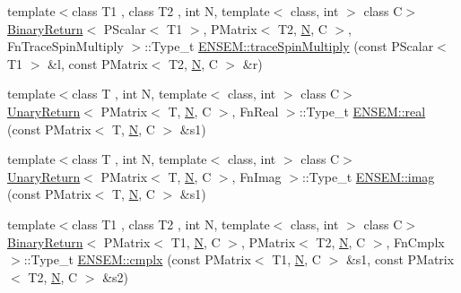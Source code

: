 \begin{DoxyCompactItemize}
\item 
{\footnotesize template$<$class T1 , class T2 , int N, template$<$ class, int $>$ class C$>$ }\\\mbox{\hyperlink{structBinaryReturn}{Binary\+Return}}$<$ P\+Scalar$<$ T1 $>$, P\+Matrix$<$ T2, \mbox{\hyperlink{adat__devel_2lib_2hadron_2operator__name__util_8cc_a7722c8ecbb62d99aee7ce68b1752f337}{N}}, C $>$, Fn\+Trace\+Spin\+Multiply $>$\+::Type\+\_\+t \mbox{\hyperlink{group__primmatrix_gafb9febbc048f38bb6e1dc7d60d8dde8d}{E\+N\+S\+E\+M\+::trace\+Spin\+Multiply}} (const P\+Scalar$<$ T1 $>$ \&l, const P\+Matrix$<$ T2, \mbox{\hyperlink{adat__devel_2lib_2hadron_2operator__name__util_8cc_a7722c8ecbb62d99aee7ce68b1752f337}{N}}, C $>$ \&r)
\item 
{\footnotesize template$<$class T , int N, template$<$ class, int $>$ class C$>$ }\\\mbox{\hyperlink{structUnaryReturn}{Unary\+Return}}$<$ P\+Matrix$<$ T, \mbox{\hyperlink{adat__devel_2lib_2hadron_2operator__name__util_8cc_a7722c8ecbb62d99aee7ce68b1752f337}{N}}, C $>$, Fn\+Real $>$\+::Type\+\_\+t \mbox{\hyperlink{group__primmatrix_ga5d6f44c46b47f8dc972b40a518058e0e}{E\+N\+S\+E\+M\+::real}} (const P\+Matrix$<$ T, \mbox{\hyperlink{adat__devel_2lib_2hadron_2operator__name__util_8cc_a7722c8ecbb62d99aee7ce68b1752f337}{N}}, C $>$ \&s1)
\item 
{\footnotesize template$<$class T , int N, template$<$ class, int $>$ class C$>$ }\\\mbox{\hyperlink{structUnaryReturn}{Unary\+Return}}$<$ P\+Matrix$<$ T, \mbox{\hyperlink{adat__devel_2lib_2hadron_2operator__name__util_8cc_a7722c8ecbb62d99aee7ce68b1752f337}{N}}, C $>$, Fn\+Imag $>$\+::Type\+\_\+t \mbox{\hyperlink{group__primmatrix_ga0e708a122654c3ad8295f071a5857abb}{E\+N\+S\+E\+M\+::imag}} (const P\+Matrix$<$ T, \mbox{\hyperlink{adat__devel_2lib_2hadron_2operator__name__util_8cc_a7722c8ecbb62d99aee7ce68b1752f337}{N}}, C $>$ \&s1)
\item 
{\footnotesize template$<$class T1 , class T2 , int N, template$<$ class, int $>$ class C$>$ }\\\mbox{\hyperlink{structBinaryReturn}{Binary\+Return}}$<$ P\+Matrix$<$ T1, \mbox{\hyperlink{adat__devel_2lib_2hadron_2operator__name__util_8cc_a7722c8ecbb62d99aee7ce68b1752f337}{N}}, C $>$, P\+Matrix$<$ T2, \mbox{\hyperlink{adat__devel_2lib_2hadron_2operator__name__util_8cc_a7722c8ecbb62d99aee7ce68b1752f337}{N}}, C $>$, Fn\+Cmplx $>$\+::Type\+\_\+t \mbox{\hyperlink{group__primmatrix_ga895c61e14c8d4206a949f44e36add5c6}{E\+N\+S\+E\+M\+::cmplx}} (const P\+Matrix$<$ T1, \mbox{\hyperlink{adat__devel_2lib_2hadron_2operator__name__util_8cc_a7722c8ecbb62d99aee7ce68b1752f337}{N}}, C $>$ \&s1, const P\+Matrix$<$ T2, \mbox{\hyperlink{adat__devel_2lib_2hadron_2operator__name__util_8cc_a7722c8ecbb62d99aee7ce68b1752f337}{N}}, C $>$ \&s2)

\end{DoxyCompactItemize}
